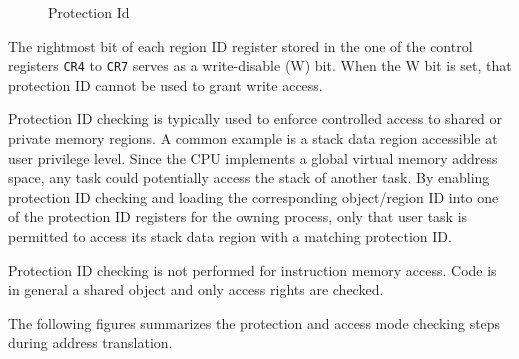 \begin{figure}[H]
\begin{center}
\end{center}
\caption{Protection Id}
\label{fig:Protection id}
\end{figure}

The rightmost bit of each region ID register stored in the one of the control registers \texttt{CR4} to \texttt{CR7} serves as a write-disable (W) bit. When the W bit is set, that protection ID cannot be used to grant write access.

Protection ID checking is typically used to enforce controlled access to shared or private memory regions. A common example is a stack data region accessible at user privilege level. Since the CPU implements a global virtual memory address space, any task could potentially access the stack of another task. By enabling protection ID checking and loading the corresponding object/region ID into one of the protection ID registers for the owning process, only that user task is permitted to access its stack data region with a matching protection ID.

Protection ID checking is not performed for instruction memory access. Code is in general a shared object and only access rights are checked.



The following figures summarizes the protection and access mode checking steps during address translation.
 
